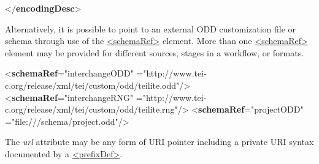 \begin{shaded}
\hspace*{1em}\mbox{}\newline 
\hspace*{1em}\mbox{}\newline 
{}\mbox{}\newline 
{</\textbf{encodingDesc}>}\end{shaded}\egroup\par \par
Alternatively, it is possible to point to an external ODD customization file or schema through use of the \hyperref[TEI.schemaRef]{<schemaRef>} element. More than one \hyperref[TEI.schemaRef]{<schemaRef>} element may be provided for different sources, stages in a workflow, or formats. \par\bgroup{}\exampleFont \begin{shaded}\noindent\mbox{}{<\textbf{schemaRef}\hspace*{1em}{type}="{interchangeODD}"\mbox{}\newline 
\hspace*{1em}{url}="{http://www.tei-c.org/release/xml/tei/custom/odd/tei\textunderscore lite.odd}"/>}\mbox{}\newline 
{<\textbf{schemaRef}\hspace*{1em}{type}="{interchangeRNG}"\mbox{}\newline 
\hspace*{1em}{url}="{http://www.tei-c.org/release/xml/tei/custom/odd/tei\textunderscore lite.rng}"/>}\mbox{}\newline 
{<\textbf{schemaRef}\hspace*{1em}{type}="{projectODD}"\mbox{}\newline 
\hspace*{1em}{url}="{file:///schema/project.odd}"/>}\end{shaded}\egroup\par \noindent  The {\itshape url} attribute may be any form of URI pointer including a private URI syntax documented by a \hyperref[TEI.prefixDef]{<prefixDef>}.
